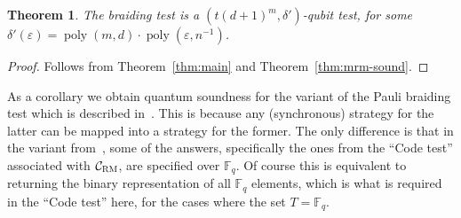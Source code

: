 \documentclass[11pt]{article}
\newtheorem{theorem}{Theorem}[section]
\theoremstyle{definition}
\newcommand{\code}{\mathcal{C}}
\newcommand{\F}{\ensuremath{\mathbb{F}}}
\newcommand{\RM}{\ensuremath{\textsc{RM}}}
\DeclareMathOperator{\poly}{poly}
\newcommand{\eps}{\varepsilon}
\begin{document}
\begin{theorem}
The braiding test is a $(t(d+1)^m,\delta')$-qubit test, for some $\delta'(\eps)=\poly(m,d)\cdot \poly(\eps,n^{-1})$.
\end{theorem}

\begin{proof}
Follows from Theorem~\ref{thm:main} and Theorem~\ref{thm:mrm-sound}.
\end{proof}

As a corollary we obtain quantum soundness for the variant of the Pauli braiding test which is described in~\cite[Section 7.3]{ji2020mip}. This is because any (synchronous) strategy for the latter can be mapped into a strategy for the former. The only difference is that in the variant from~\cite{ji2020mip}, some of the answers, specifically the ones from the ``Code test'' associated with $\code_\RM$, are specified over $\F_q$. Of course this is equivalent to returning the binary representation of all $\F_q$ elements, which is what is required in the ``Code test'' here, for the cases where the set $T=\F_q$. 

%



\notesendofpaper
\end{document}
